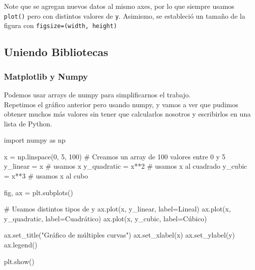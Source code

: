 \documentclass[
  letterpaper,
  DIV=11,
  numbers=noendperiod]{scrreprt}
\newenvironment{Shaded}{\begin{snugshade}}{\end{snugshade}}
\newcommand{\CommentTok}[1]{\textcolor[rgb]{0.37,0.37,0.37}{#1}}
\newcommand{\DecValTok}[1]{\textcolor[rgb]{0.68,0.00,0.00}{#1}}
\newcommand{\ImportTok}[1]{\textcolor[rgb]{0.00,0.46,0.62}{#1}}
\newcommand{\NormalTok}[1]{\textcolor[rgb]{0.00,0.23,0.31}{#1}}
\newcommand{\OperatorTok}[1]{\textcolor[rgb]{0.37,0.37,0.37}{#1}}
\newcommand{\StringTok}[1]{\textcolor[rgb]{0.13,0.47,0.30}{#1}}
\begin{document}
Note que se agregan nuevos datos al mismo axes, por lo que siempre
usamos \texttt{plot()} pero con distintos valores de \texttt{y}.
Asimismo, se estableció un tamaño de la figura con
\texttt{figsize=(width,\ height)}

\subsection{Uniendo Bibliotecas}\label{uniendo-bibliotecas}

\subsubsection{Matplotlib y Numpy}\label{matplotlib-y-numpy}

Podemos usar arrays de numpy para simplificarnos el trabajo.\\
Repetimos el gráfico anterior pero usando numpy, y vamos a ver que
pudimos obtener muchos más valores sin tener que calcularlos nosotros y
escribirlos en una lista de Python.

\begin{Shaded}
\begin{Highlighting}[]
\ImportTok{import}\NormalTok{ numpy }\ImportTok{as}\NormalTok{ np}

\NormalTok{x }\OperatorTok{=}\NormalTok{ np.linspace(}\DecValTok{0}\NormalTok{, }\DecValTok{5}\NormalTok{, }\DecValTok{100}\NormalTok{) }\CommentTok{\# Creamos un array de 100 valores entre 0 y 5}
\NormalTok{y\_linear }\OperatorTok{=}\NormalTok{ x }\CommentTok{\# usamos x}
\NormalTok{y\_quadratic }\OperatorTok{=}\NormalTok{ x}\OperatorTok{**}\DecValTok{2} \CommentTok{\# usamos x al cuadrado}
\NormalTok{y\_cubic }\OperatorTok{=}\NormalTok{ x}\OperatorTok{**}\DecValTok{3} \CommentTok{\# usamos x al cubo}

\NormalTok{fig, ax }\OperatorTok{=}\NormalTok{ plt.subplots()}

\CommentTok{\# Usamos distintos tipos de y}
\NormalTok{ax.plot(x, y\_linear, label}\OperatorTok{=}\StringTok{\textquotesingle{}Lineal\textquotesingle{}}\NormalTok{)}
\NormalTok{ax.plot(x, y\_quadratic, label}\OperatorTok{=}\StringTok{\textquotesingle{}Cuadrático\textquotesingle{}}\NormalTok{)}
\NormalTok{ax.plot(x, y\_cubic, label}\OperatorTok{=}\StringTok{\textquotesingle{}Cúbico\textquotesingle{}}\NormalTok{)}

\NormalTok{ax.set\_title(}\StringTok{"Gráfico de múltiples curvas"}\NormalTok{)}
\NormalTok{ax.set\_xlabel(}\StringTok{\textquotesingle{}x\textquotesingle{}}\NormalTok{)}
\NormalTok{ax.set\_ylabel(}\StringTok{\textquotesingle{}y\textquotesingle{}}\NormalTok{)}
\NormalTok{ax.legend()}

\NormalTok{plt.show()}
\end{Highlighting}
\end{Shaded}
\end{document}

